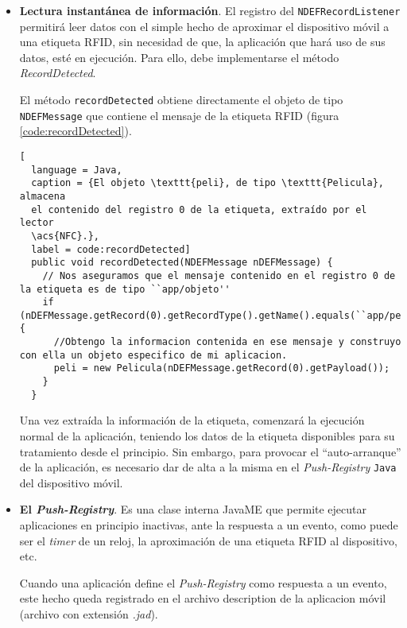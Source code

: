 \begin{itemize}
\begin{lstlisting}[
  language = Java,
  caption = {Se eliminan los \emph{Listener}s añadidos en el listado
  \ref{code:addListener}.},
  label = code:removeListener]
  try {
    DiscoveryManager.getInstance().removeNDEFRecordListener(this, new
    NDEFRecordType(NDEFRecordType.MIME,``app/mi_tipo''));
    DiscoveryManager.getInstance().removeTargetListener(this, TargetType.NDEF_TAG);
  } catch (...) { }
\end{lstlisting}

\item \textbf{Lectura instantánea de información}. El registro del
\texttt{NDEFRecordListener} permitirá leer datos con el simple
hecho de aproximar el dispositivo móvil a una etiqueta \acs{RFID}, sin 
necesidad de que, la aplicación que hará uso de sus datos, esté en ejecución.
Para ello, debe implementarse el método \emph{RecordDetected}.

El método \texttt{recordDetected} obtiene directamente el objeto de tipo
\texttt{NDEFMessage} que contiene el mensaje de la etiqueta \acs{RFID}
(figura \ref{code:recordDetected}).

\begin{lstlisting}[
  language = Java,
  caption = {El objeto \texttt{peli}, de tipo \texttt{Pelicula}, almacena
  el contenido del registro 0 de la etiqueta, extraído por el lector
  \acs{NFC}.},
  label = code:recordDetected]
  public void recordDetected(NDEFMessage nDEFMessage) {
    // Nos aseguramos que el mensaje contenido en el registro 0 de la etiqueta es de tipo ``app/objeto''
    if (nDEFMessage.getRecord(0).getRecordType().getName().equals(``app/pelicula'')){
      //Obtengo la informacion contenida en ese mensaje y construyo con ella un objeto especifico de mi aplicacion.
      peli = new Pelicula(nDEFMessage.getRecord(0).getPayload());
    }
  }
\end{lstlisting}

Una vez extraída la información de la etiqueta, comenzará la ejecución normal
de la aplicación, teniendo los datos de la etiqueta disponibles para su
tratamiento desde el principio. Sin embargo, para provocar el ``auto-arranque''
de la aplicación, es necesario dar de alta a la misma en el
\emph{Push-Registry} \texttt{Java} del dispositivo móvil.

\item \textbf{El \emph{Push-Registry}}. Es una clase interna \acs{JavaME} que 
permite ejecutar aplicaciones en principio inactivas, ante la respuesta a un 
evento, como puede ser el \emph{timer} de un reloj, la aproximación de una 
etiqueta \acs{RFID} al dispositivo, etc.

Cuando una aplicación define el \emph{Push-Registry} como respuesta a un
evento, este hecho queda registrado en el archivo description de la
aplicacion móvil (archivo con extensión \emph{.jad}).
\end{itemize}

